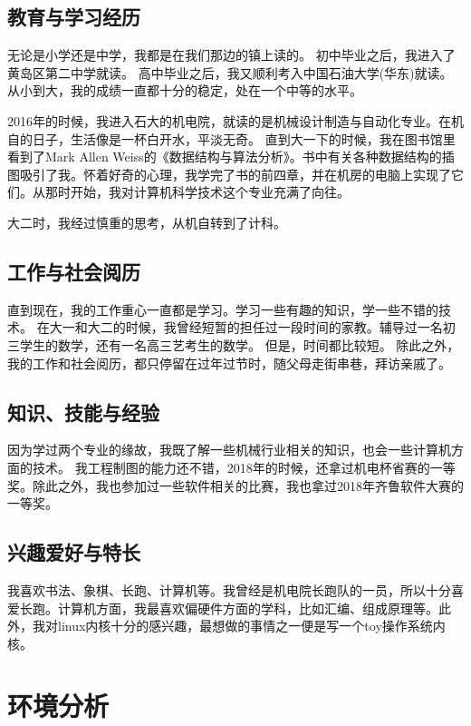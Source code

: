 \documentclass{article}
\begin{document}
\subsection{教育与学习经历}
无论是小学还是中学，我都是在我们那边的镇上读的。
初中毕业之后，我进入了黄岛区第二中学就读。
高中毕业之后，我又顺利考入中国石油大学(华东)就读。
从小到大，我的成绩一直都十分的稳定，处在一个中等的水平。
\par
2016年的时候，我进入石大的机电院，就读的是机械设计制造与自动化专业。在机自的日子，生活像是一杯白开水，平淡无奇。
直到大一下的时候，我在图书馆里看到了Mark Allen Weiss的《数据结构与算法分析》。书中有关各种数据结构的插图吸引了我。怀着好奇的心理，我学完了书的前四章，并在机房的电脑上实现了它们。从那时开始，我对计算机科学技术这个专业充满了向往。\par
大二时，我经过慎重的思考，从机自转到了计科。\par
\par
\subsection{工作与社会阅历}
直到现在，我的工作重心一直都是学习。学习一些有趣的知识，学一些不错的技术。
在大一和大二的时候，我曾经短暂的担任过一段时间的家教。辅导过一名初三学生的数学，还有一名高三艺考生的数学。
但是，时间都比较短。
除此之外，我的工作和社会阅历，都只停留在过年过节时，随父母走街串巷，拜访亲戚了。
\par
\subsection{知识、技能与经验}
因为学过两个专业的缘故，我既了解一些机械行业相关的知识，也会一些计算机方面的技术。
我工程制图的能力还不错，2018年的时候，还拿过机电杯省赛的一等奖。除此之外，我也参加过一些软件相关的比赛，我也拿过2018年齐鲁软件大赛的一等奖。

\par
\subsection{兴趣爱好与特长}
我喜欢书法、象棋、长跑、计算机等。我曾经是机电院长跑队的一员，所以十分喜爱长跑。计算机方面，我最喜欢偏硬件方面的学科，比如汇编、组成原理等。此外，我对linux内核十分的感兴趣，最想做的事情之一便是写一个toy操作系统内核。
\par
\newpage
\section{环境分析}
\end{document}
